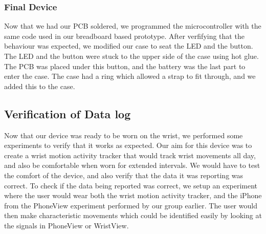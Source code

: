 \subsubsection{Final Device}
\label{Sec:FinalDevice}
Now that we had our PCB soldered,
we programmed the microcontroller with the same code used in our breadboard based prototype.
After verfifying that the behaviour was expected,
we modified our case to seat the LED and the button.
The LED and the button were stuck to the upper side of the case using hot glue.
The PCB was placed under this button, and the battery was the last part to enter the case.
The case had a ring which allowed a strap to fit through,
and we added this to the case.

\subsection{Verification of Data log}
\label{Sec:Motion Data}
Now that our device was ready to be worn on the wrist,
we performed some experiments to verify that it works as expected.
Our aim for this device was to create a wrist motion activity tracker that would track wrist movements all day,
and also be comfortable when worn for extended intervals.
We would have to test the comfort of the device,
and also verify that the data it was reporting was correct.
To check if the data being reported was correct,
we setup an experiment where the user would wear both the wrist motion activity tracker,
and the iPhone from the PhoneView experiment performed by our group earlier.
The user would then make characteristic movements which could be identified easily by looking at the signals in PhoneView or WristView.



